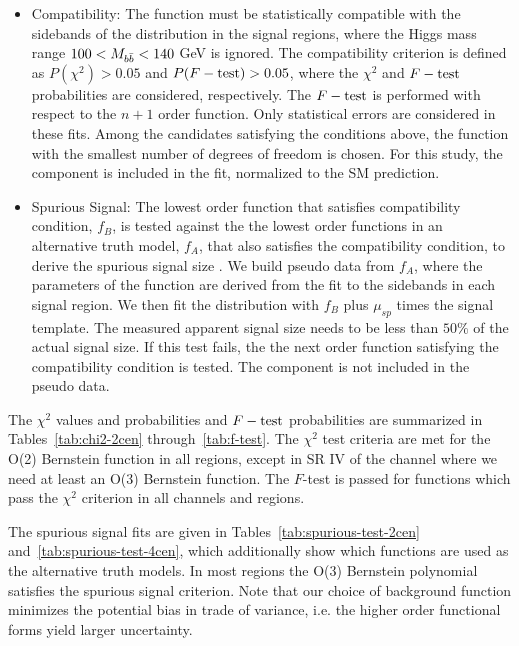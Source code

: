 \begin{itemize}
\item 
Compatibility: The function must be statistically  compatible with the sidebands of the \Mbb{} distribution in the signal regions, where the Higgs mass range $100<M_{b\bar{b}}<140$ GeV is ignored. The compatibility criterion is defined as $P(\chi^2)>0.05$ and $P(F-\rm{test})>0.05$,  where the $\chi^2$ and $F-\rm{test}$ probabilities are considered, respectively. The $F-\rm{test}$ is performed with respect to the $n+1$ order function.  Only statistical errors are considered in these fits.  Among the candidates satisfying the conditions above, the function with the smallest number of degrees of freedom is chosen. For this study, the \zjets{} component is included in the fit,  normalized to the SM prediction.

\item Spurious Signal:  The lowest order function that satisfies compatibility condition, $f_{B}$, is tested against the the lowest order functions in an alternative truth model, $f_{A}$, that also satisfies the compatibility condition, to derive the spurious signal size \cite{CMS-HIG-12-028}.  We build pseudo data from $f_{A}$, where the parameters of the function are derived from the fit to the sidebands in each signal region.  We then fit the distribution with $f_{B}$ plus $\mu_{sp}$ times the signal template. The measured  apparent signal size needs to be less than $50\%$ of the actual signal size. If this test fails, the the next order function satisfying the compatibility condition is tested.  The \zjets{} component is not included in the pseudo data.

\end{itemize}


The $\chi^2$ values and probabilities and $F-\rm{test}$ probabilities are summarized in Tables~\ref{tab:chi2-2cen} through~\ref{tab:f-test}. The $\chi^2$ test criteria are met for the O(2) Bernstein function in all regions, except in 
SR IV of the \fourcentral channel where we need at least an O(3) Bernstein function. The $F$-test is passed for functions which pass the $\chi^2$ criterion in all channels and regions.

The spurious signal fits are given in Tables~\ref{tab:spurious-test-2cen} and~\ref{tab:spurious-test-4cen}, which additionally show which functions are used as the alternative truth models. In most regions the O(3) Bernstein polynomial satisfies the spurious signal criterion. Note that our choice of background function minimizes the potential bias in trade of variance, i.e. the higher order functional forms yield larger uncertainty.

